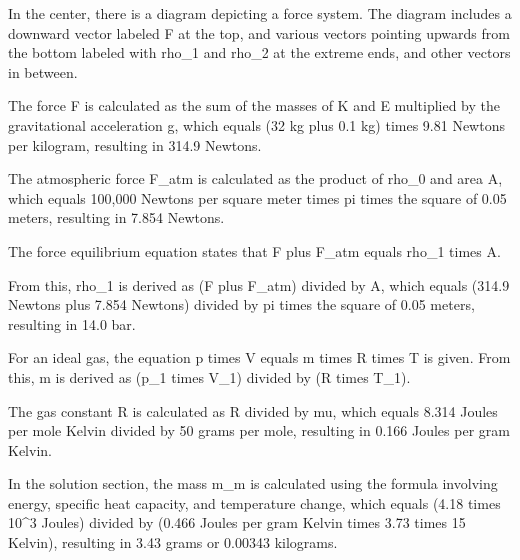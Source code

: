 In the center, there is a diagram depicting a force system. The diagram includes a downward vector labeled F at the top, and various vectors pointing upwards from the bottom labeled with rho_1 and rho_2 at the extreme ends, and other vectors in between.

The force F is calculated as the sum of the masses of K and E multiplied by the gravitational acceleration g, which equals (32 kg plus 0.1 kg) times 9.81 Newtons per kilogram, resulting in 314.9 Newtons.

The atmospheric force F_atm is calculated as the product of rho_0 and area A, which equals 100,000 Newtons per square meter times pi times the square of 0.05 meters, resulting in 7.854 Newtons.

The force equilibrium equation states that F plus F_atm equals rho_1 times A.

From this, rho_1 is derived as (F plus F_atm) divided by A, which equals (314.9 Newtons plus 7.854 Newtons) divided by pi times the square of 0.05 meters, resulting in 14.0 bar.

For an ideal gas, the equation p times V equals m times R times T is given. From this, m is derived as (p_1 times V_1) divided by (R times T_1).

The gas constant R is calculated as R divided by mu, which equals 8.314 Joules per mole Kelvin divided by 50 grams per mole, resulting in 0.166 Joules per gram Kelvin.

In the solution section, the mass m_m is calculated using the formula involving energy, specific heat capacity, and temperature change, which equals (4.18 times 10^3 Joules) divided by (0.466 Joules per gram Kelvin times 3.73 times 15 Kelvin), resulting in 3.43 grams or 0.00343 kilograms.